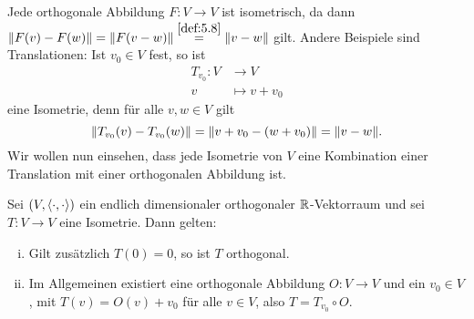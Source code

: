 Jede orthogonale Abbildung $F \colon V \rightarrow V$ ist isometrisch, da dann $\left\lVert F(v) - F(w)\right\rVert = \left\lVert F(v-w)\right\rVert \stackrel{\ref{def:5.8}}{=} \left\lVert v-w\right\rVert$ gilt.
Andere Beispiele sind Translationen:
Ist $v_0 \in V$ fest, so ist
\begin{align*}
	T_{v_0}\colon V &\longrightarrow V \\
	v &\longmapsto v + v_0
\end{align*}
eine Isometrie, denn für alle $v,w \in V$ gilt
\[
	\no{T_{v_0}(v) - T_{v_0}(w)} = \no{v+v_0 - (w+ v_0)} = \no{v-w}.
\]
Wir wollen nun einsehen, dass jede Isometrie von $V$ eine Kombination einer Translation mit einer orthogonalen Abbildung ist.

\begin{satz}
	\label{satz:6.11}
	Sei $(V,\left\langle\cdot,\cdot\right\rangle)$ ein endlich dimensionaler orthogonaler $\mathbb{R}$-Vektorraum und sei $T \colon V \rightarrow V$ eine Isometrie.
	Dann gelten:
	\begin{enumerate}[(i)]
		\item Gilt zusätzlich $T(0) = 0$, so ist $T$ orthogonal.
		\item Im Allgemeinen existiert eine orthogonale Abbildung $O \colon V \rightarrow V$ und ein $v_0 \in V$, mit $T(v) = O(v) + v_0$ für alle $v \in V$, also $T = T_{v_0} \circ O$.
	\end{enumerate}
\end{satz}


